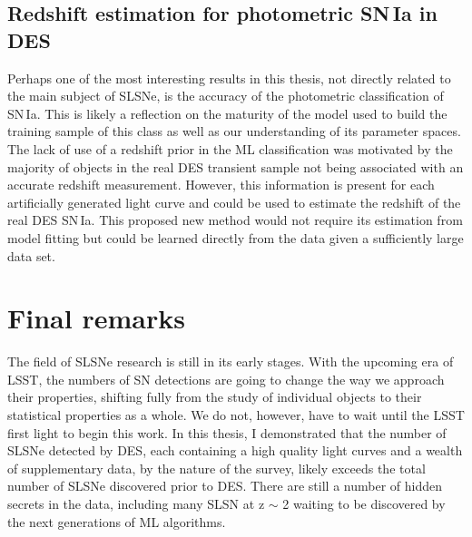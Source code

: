 \subsection{Redshift estimation for photometric SN\,Ia in DES}
Perhaps one of the most interesting results in this thesis, not directly related to the main subject of SLSNe, is the accuracy of the photometric classification of SN\,Ia. This is likely a reflection on the maturity of the model used to build the training sample of this class as well as our understanding of its parameter spaces. The lack of use of a redshift prior in the ML classification was motivated by the majority of objects in the real DES transient sample not being associated with an accurate redshift measurement. However, this information is present for each artificially generated light curve and could be used to estimate the redshift of the real DES SN\,Ia. This proposed new method would not require its estimation from model fitting but could be learned directly from the data given a sufficiently large data set.

\section{Final remarks}
The field of SLSNe research is still in its early stages. With the upcoming era of LSST, the numbers of SN detections are going to change the way we approach their properties, shifting fully from the study of individual objects to their statistical properties as a whole. We do not, however, have to wait until the LSST first light to begin this work. In this thesis, I demonstrated that the number of SLSNe detected by DES, each containing a high quality light curves and a wealth of supplementary data, by the nature of the survey, likely exceeds the total number of SLSNe discovered prior to DES. There are still a number of hidden secrets in the data, including many SLSN at z $\sim$ 2 waiting to be discovered by the next generations of ML algorithms.
